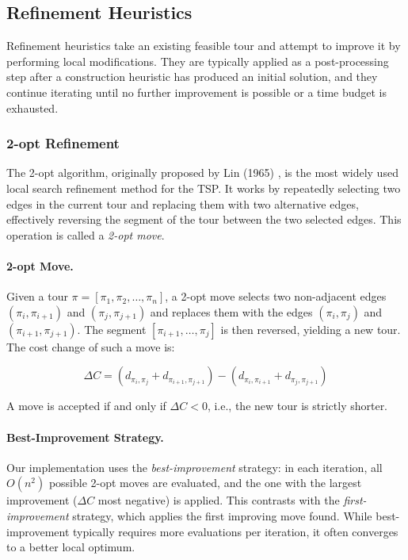 \documentclass{article}
\begin{document}
\subsection{Refinement Heuristics}

Refinement heuristics take an existing feasible tour and attempt to improve it by performing
local modifications. They are typically applied as a post-processing step after a
construction heuristic has produced an initial solution, and they continue iterating until
no further improvement is possible or a time budget is exhausted.

\subsubsection{2-opt Refinement}

The 2-opt algorithm, originally proposed by Lin (1965) \cite{lin1965}, is the most widely
used local search refinement method for the TSP. It works by repeatedly selecting two edges
in the current tour and replacing them with two alternative edges, effectively reversing the
segment of the tour between the two selected edges. This operation is called a \textit{2-opt
move}.

\paragraph{2-opt Move.}
Given a tour $\pi = [\pi_1, \pi_2, \ldots, \pi_n]$, a 2-opt move selects two non-adjacent
edges $(\pi_i, \pi_{i+1})$ and $(\pi_j, \pi_{j+1})$ and replaces them with the edges
$(\pi_i, \pi_j)$ and $(\pi_{i+1}, \pi_{j+1})$. The segment $[\pi_{i+1}, \ldots, \pi_j]$
is then reversed, yielding a new tour. The cost change of such a move is:

\[
\Delta C = \left( d_{\pi_i, \pi_j} + d_{\pi_{i+1}, \pi_{j+1}} \right)
         - \left( d_{\pi_i, \pi_{i+1}} + d_{\pi_j, \pi_{j+1}} \right)
\]

A move is accepted if and only if $\Delta C < 0$, i.e., the new tour is strictly shorter.

\paragraph{Best-Improvement Strategy.}
Our implementation uses the \textit{best-improvement} strategy: in each iteration, all $O(n^2)$ possible 2-opt moves are evaluated, and the one
with the largest improvement ($\Delta C$ most negative) is applied. This contrasts with the
\textit{first-improvement} strategy, which applies the first improving move found. While
best-improvement typically requires more evaluations per iteration, it often converges to a better local optimum.
\end{document}
